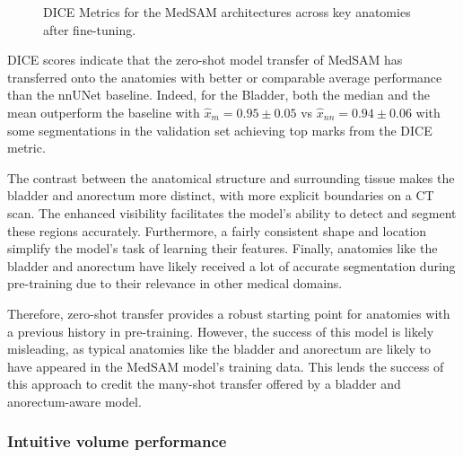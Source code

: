 \documentclass[12pt,twoside]{report}
\begin{document}
\begin{figure}
  \centering
  \vspace*{1em}
  \caption{DICE Metrics for the MedSAM architectures across key anatomies after fine-tuning.}\label{fig:medsam-finetune-dice}
\end{figure}

DICE scores indicate that the zero-shot model transfer of MedSAM has transferred onto the anatomies with better or comparable average performance than the nnUNet baseline. Indeed, for the Bladder, both the median and the mean outperform the baseline with $\hat{x}_m = 0.95 \pm 0.05$ vs $\hat{x}_{nn} = 0.94 \pm 0.06$ with some segmentations in the validation set achieving top marks from the DICE metric. 

The contrast between the anatomical structure and surrounding tissue makes the bladder and anorectum more distinct, with more explicit boundaries on a CT scan. The enhanced visibility facilitates the model's ability to detect and segment these regions accurately. Furthermore, a fairly consistent shape and location simplify the model's task of learning their features. Finally, anatomies like the bladder and anorectum have likely received a lot of accurate segmentation during pre-training due to their relevance in other medical domains.

Therefore, zero-shot transfer provides a robust starting point for anatomies with a previous history in pre-training. However, the success of this model is likely misleading, as typical anatomies like the bladder and anorectum are likely to have appeared in the MedSAM model's training data. This lends the success of this approach to credit the many-shot transfer offered by a bladder and anorectum-aware model.

\subsubsection{Intuitive volume performance}
\end{document}
